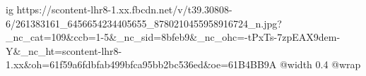  
 
 
 
 

\ifcmt
  ig https://scontent-lhr8-1.xx.fbcdn.net/v/t39.30808-6/261383161_6456654234405655_8780210455958916724_n.jpg?_nc_cat=109&ccb=1-5&_nc_sid=8bfeb9&_nc_ohc=-tPxTs-7zpEAX9dem-Y&_nc_ht=scontent-lhr8-1.xx&oh=61f59a6fdbfab499bfca95bb2bc536ed&oe=61B4BB9A
  @width 0.4
  @wrap 
\fi
